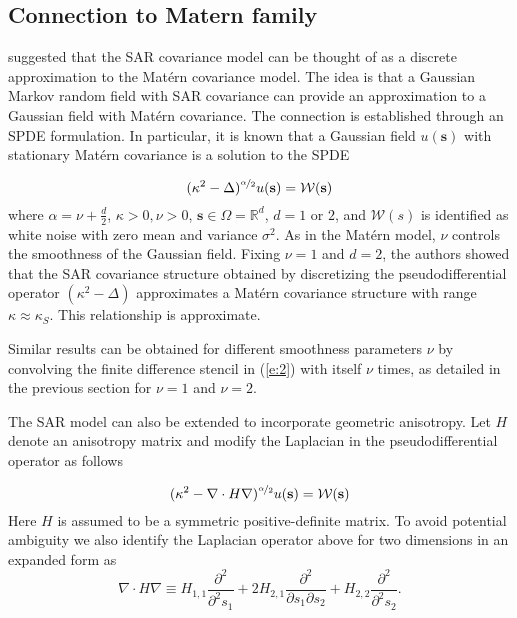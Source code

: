 \documentclass[review]{elsarticle}
\begin{document}
\subsection{Connection to Matern family}


\citet{lindgren2011explicit} suggested that the SAR covariance model can be thought of as a discrete approximation to the Mat\'ern covariance model. The idea is that a Gaussian Markov random field with SAR covariance can provide an approximation to a Gaussian field with Mat\'ern covariance. The connection is established through an SPDE formulation. In particular, it is known that a Gaussian field $u(\mathbf s)$ with stationary Mat\'ern covariance is a solution to the SPDE

$$ (\kappa^2 - \Delta)^{\nicefrac{\alpha}{2}} u(\mathbf s) = \mathcal{W}(\mathbf s) $$
where $\alpha = \nu + \frac{d}{2}$, $\kappa > 0, \nu > 0$, $\mathbf s \in \Omega = \mathbb{R}^d$, $d = 1$ or $2$, and $\mathcal{W}(s)$ is identified as white noise with zero mean and variance $\sigma^2$. As in the Mat\'ern model, $\nu$ controls the smoothness of the Gaussian field. Fixing $\nu = 1$ and $d = 2$, the authors showed that the SAR covariance structure obtained by discretizing the pseudodifferential operator $(\kappa^2 - \Delta)$ approximates a Mat\'ern covariance structure with range $\kappa \approx \kappa_S$. This relationship is approximate.

Similar results can be obtained for different smoothness parameters $\nu$ by convolving the finite difference stencil in (\ref{e:2}) with itself $\nu$ times, as detailed in the previous section for $\nu=1$ and $\nu=2$.

 The SAR model can also be extended to incorporate geometric anisotropy. Let $H$  denote an anisotropy matrix and modify the  Laplacian in the pseudodifferential operator as follows

\begin{equation}
\label{SPDE}
 (\kappa^2 - \nabla \cdot H \nabla)^{\nicefrac{\alpha}{2}} u(\mathbf s) = \mathcal{W}(\mathbf s) 
 \end{equation} 
Here $H$ is assumed to be a symmetric positive-definite matrix.
 To avoid potential ambiguity we also identify  the Laplacian  operator above for two dimensions  in an expanded form as 
\[  \nabla \cdot H \nabla  \equiv  H_{1,1} \frac{\partial^2}{\partial^2 s_1} +  2 H_{2,1} \frac{\partial^2}{\partial s_1 \partial s_2} + H_{2,2} \frac{\partial^2}{\partial^2 s_2}. \]
\end{document}
